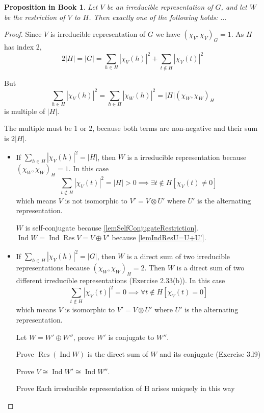 \documentclass[12pt, letterpaper]{article}
\newcommand{\Res}{\operatorname{Res}}
\newcommand{\Ind}{\operatorname{Ind}}
\newcommand{\red}[1]{{\color{red} #1}}
\newcommand{\abs}[1]{\left\lvert #1 \right\rvert}
\newcommand{\card}[1]{\left\lvert #1 \right\rvert}
\theoremstyle{definition}
\theoremstyle{remark}
\theoremstyle{definition}
\theoremstyle{plain}
\newtheorem{pprop}[exe]{Proposition in Book}
\numberwithin{equation}{section}
\begin{document}
	\begin{pprop}
		Let $V$ be an irreducible representation of $G$, and let $W$
		be the restriction of $V$ to $H$. Then exactly one of the following holds:
		$\dots$
	\end{pprop}
	\begin{proof}
		Since $V$ is irreducible representation of $G$
		we have $(\chi_V,\chi_V)_G=1$.
		As $H$ has index 2,
		\[2\card{H}=\card{G}=\sum_{h\in H}\abs{\chi_V(h)}^2+\sum_{t\notin H}\abs{\chi_V(t)}^2 \]
		
		But
		\[\sum_{h\in H}\abs{\chi_V(h)}^2=\sum_{h\in H}\abs{\chi_W(h)}^2=\card{H}(\chi_W,\chi_W)_H\]
		is multiple of $\card{H}$.

		The multiple must be 1 or 2, because both terms are non-negative and their sum is $2\card{H}$.
		
		\begin{itemize}
			\item If $\sum_{h\in H}\abs{\chi_V(h)}^2=\card{H}$, then $W$ is a irreducible representation 
			because $(\chi_W,\chi_W)_H=1$. In this case 
			\[\sum_{t\notin H}\abs{\chi_V(t)}^2=\card{H}>0\implies 
			\exists t\notin H[\chi_V(t)\ne 0]\]
			which means $V$ is not isomorphic to $V'=V\otimes U'$ where $U'$ is the alternating representation.
			
			$W$ is self-conjugate because \autoref{lemSelfConjugateRestriction}.
			$\Ind W=\Ind \Res V=V\oplus V'$ because \autoref{lemIndResU=U+U'}.
			
			\item If $\sum_{h\in H}\abs{\chi_V(h)}^2=\card{G}$, then $W$ is a direct sum of two irreducible representations 
			because $(\chi_W,\chi_W)_H=2$. Then $W$ is a direct sum of two different irreducible representations
			(Exercise 2.33(b)).
			In this case 
			\[\sum_{t\notin H}\abs{\chi_V(t)}^2=0\implies 
			\forall  t\notin H[\chi_V(t)=0]\]
			which means $V$ is isomorphic to $V'=V\otimes U'$ where $U'$ is the alternating representation.
			
			Let $W=W'\oplus W''$, \red{prove $W'$ is conjugate to $W''$.}
			
			\red{Prove $\Res(\Ind W)$ is the direct sum of $W$ and its conjugate (Exercise 3.l9)}
			
			\red{Prove $V\cong \Ind W' \cong \Ind W''$.}
			
			\red{Prove Each irreducible representation of H arises uniquely in this way}
		\end{itemize}
	\end{proof}
\end{document}
